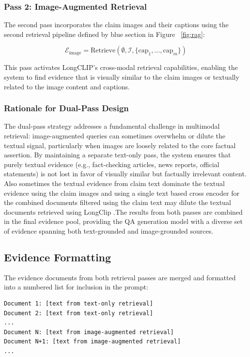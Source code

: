 \subsubsection{Pass 2: Image-Augmented Retrieval}

The second pass incorporates the claim images and their captions using the second retrieval pipeline defined by blue section in Figure ~\ref{fig:rag}:

\begin{equation}
    \mathcal{E}_{\text{image}} = \text{Retrieve}(\emptyset, \mathcal{I}, \{\text{cap}_1, \ldots, \text{cap}_m\})
\end{equation}

This pass activates LongCLIP's cross-modal retrieval capabilities, enabling the system to find evidence that is visually similar to the claim images or textually related to the image content and captions.

\subsubsection{Rationale for Dual-Pass Design}

The dual-pass strategy addresses a fundamental challenge in multimodal retrieval: image-augmented queries can sometimes overwhelm or dilute the textual signal, particularly when images are loosely related to the core factual assertion. By maintaining a separate text-only pass, the system ensures that purely textual evidence (e.g., fact-checking articles, news reports, official statements) is not lost in favor of visually similar but factually irrelevant content. Also sometimes the textual evidence from claim text dominate the textual evidence using the claim images and using a single text based cross encoder for the combined documents filtered using the claim text may dilute the textual documents retrieved using LongClip .The results from both passes are combined in the final evidence pool, providing the QA generation model with a diverse set of evidence spanning both text-grounded and image-grounded sources.

\subsection{Evidence Formatting}

The evidence documents from both retrieval passes are merged and formatted into a numbered list for inclusion in the prompt:

\begin{verbatim}
Document 1: [text from text-only retrieval]
Document 2: [text from text-only retrieval]
...
Document N: [text from image-augmented retrieval]
Document N+1: [text from image-augmented retrieval]
...
\end{verbatim}

